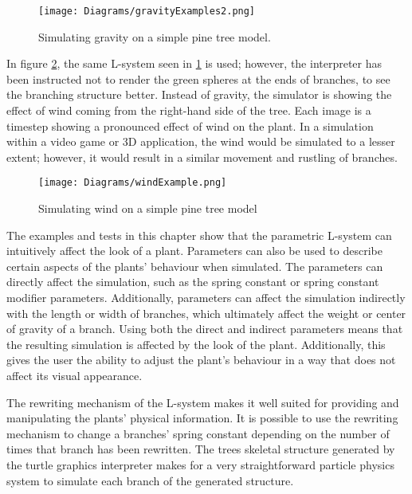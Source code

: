 \begin{figure}[htbp]
	{\centering
		\vspace{7px}
		\texttt{[image: Diagrams/gravityExamples2.png]}
		\label{3DAxisFigure} \label{Gravity applied to generated model 1}
		\caption{Simulating gravity on a simple pine tree model.}
	}
\end{figure}
\FloatBarrier

\noindent
In figure \ref{Wind applied to generated model}, the same L-system seen in \ref{Gravity applied to generated model 1} is used; however, the interpreter has been instructed not to render the green spheres at the ends of branches, to see the branching structure better. Instead of gravity, the simulator is showing the effect of wind coming from the right-hand side of the tree. Each image is a timestep showing a pronounced effect of wind on the plant. In a simulation within a video game or 3D application, the wind would be simulated to a lesser extent; however, it would result in a similar movement and rustling of branches.

\begin{figure}[htbp]
	{\centering
		\vspace{7px}
		\texttt{[image: Diagrams/windExample.png]}
		\label{3DAxisFigure} \label{Wind applied to generated model}
		\caption{Simulating wind on a simple pine tree model}
	}
\end{figure}
\FloatBarrier

\noindent
The examples and tests in this chapter show that the parametric L-system can intuitively affect the look of a plant. Parameters can also be used to describe certain aspects of the plants' behaviour when simulated. The parameters can directly affect the simulation, such as the spring constant or spring constant modifier parameters. Additionally, parameters can affect the simulation indirectly with the length or width of branches, which ultimately affect the weight or center of gravity of a branch. Using both the direct and indirect parameters means that the resulting simulation is affected by the look of the plant. Additionally, this gives the user the ability to adjust the plant's behaviour in a way that does not affect its visual appearance. 

The rewriting mechanism of the L-system makes it well suited for providing and manipulating the plants' physical information.  It is possible to use the rewriting mechanism to change a branches' spring constant depending on the number of times that branch has been rewritten. The trees skeletal structure generated by the turtle graphics interpreter makes for a very straightforward particle physics system to simulate each branch of the generated structure. 



